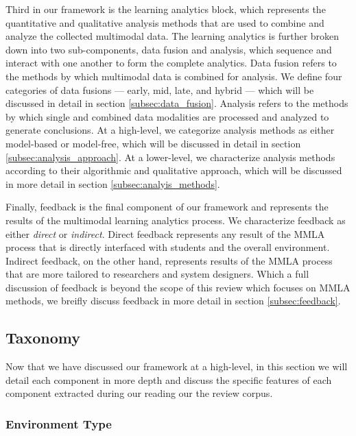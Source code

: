 \documentclass[manuscript,screen,review]{acmart}
\begin{document}
Third in our framework is the learning analytics block, which represents the quantitative and qualitative analysis methods that are used to combine and analyze the collected multimodal data. The learning analytics is further broken down into two sub-components, data fusion and analysis, which sequence and interact with one another to form the complete analytics. Data fusion refers to the methods by which multimodal data is combined for analysis. We define four categories of data fusions --- early, mid, late, and hybrid --- which will be discussed in detail in section \ref{subsec:data_fusion}. Analysis refers to the methods by which single and combined data modalities are processed and analyzed to generate conclusions. At a high-level, we categorize analysis methods as either model-based or model-free, which will be discussed in detail in section \ref{subsec:analysis_approach}. At a lower-level, we characterize analysis methods according to their algorithmic and qualitative approach, which will be discussed in more detail in section \ref{subsec:analyis_methods}.

Finally, feedback is the final component of our framework and represents the results of the multimodal learning analytics process. We characterize feedback as either \textit{direct} or \textit{indirect}. Direct feedback represents any result of the MMLA process that is directly interfaced with students and the overall environment. Indirect feedback, on the other hand, represents results of the MMLA process that are more tailored to researchers and system designers. Which a full discussion of feedback is beyond the scope of this review which focuses on MMLA methods, we breifly discuss feedback in more detail in section \ref{subsec:feedback}.



\subsection{Taxonomy}\label{subsec:taxonomy}
Now that we have discussed our framework at a high-level, in this section we will detail each component in more depth and discuss the specific features of each component extracted during our reading our the review corpus.

\subsubsection{Environment Type}\label{subsec:environment_type} %
\end{document}
